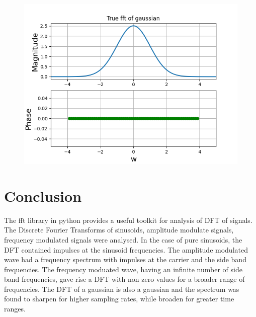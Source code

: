 \documentclass[11pt, a4paper]{article}
\begin{document}
\begin{figure}[!tbh]
\centering
\includegraphics[scale=0.8]{assgn9_plot9.png} 
\label{fig9}
\end{figure} 

\section*{Conclusion}
The fft library in python provides a useful toolkit for analysis of DFT of signals. The Discrete Fourier Transforms of sinusoids, amplitude modulate signals, frequency modulated signals were analysed. In the case of pure sinusoids, the DFT contained impulses at the sinusoid frequencies. The amplitude modulated wave had a frequency spectrum with impulses at the carrier and the side band frequencies. The frequency moduated wave, having an infinite number of side band frequencies, gave rise a DFT with non zero values for a broader range of frequencies. The DFT of a gaussian is also a gaussian and the spectrum was found to sharpen for higher sampling rates, while broaden for greater time ranges. 
\end{document}
